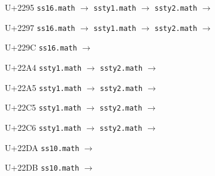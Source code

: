 \documentclass{article}
\begin{document}
\begin{substitutions}
\goodbreak

U+2295  \linebreak
    \texttt{ss16.math} $\to$  \linebreak
    \texttt{ssty1.math} $\to$  \linebreak
    \texttt{ssty2.math} $\to$  

\goodbreak

U+2297  \linebreak
    \texttt{ss16.math} $\to$  \linebreak
    \texttt{ssty1.math} $\to$  \linebreak
    \texttt{ssty2.math} $\to$  

\goodbreak

U+229C  \linebreak
    \texttt{ss16.math} $\to$  

\goodbreak

U+22A4  \linebreak
    \texttt{ssty1.math} $\to$  \linebreak
    \texttt{ssty2.math} $\to$  

\goodbreak

U+22A5  \linebreak
    \texttt{ssty1.math} $\to$  \linebreak
    \texttt{ssty2.math} $\to$  

\goodbreak

U+22C5  \linebreak
    \texttt{ssty1.math} $\to$  \linebreak
    \texttt{ssty2.math} $\to$  

\goodbreak

U+22C6  \linebreak
    \texttt{ssty1.math} $\to$  \linebreak
    \texttt{ssty2.math} $\to$  

\goodbreak

U+22DA  \linebreak
    \texttt{ss10.math} $\to$  

\goodbreak

U+22DB  \linebreak
    \texttt{ss10.math} $\to$  


\end{substitutions}
\end{document}
